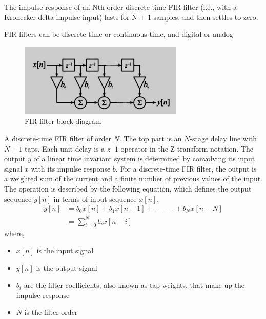 \documentclass[conference]{IEEEtran}
\begin{document}
The impulse response of an Nth-order discrete-time FIR filter (i.e., with a Kronecker delta impulse input) lasts for N + 1 samples, and then settles to zero.

FIR filters can be discrete-time or continuous-time, and digital or analog
\begin{figure}[!h]
	\begin{center} 
	    \includegraphics[width=0.8\columnwidth]{figs/FIR}
	\end{center}
\caption{FIR filter block diagram}
\label{fig:Fig1}
\end{figure}

A discrete-time FIR filter of order $N$. The top part is an $N$-stage delay line with $N+1$ taps. Each unit delay is a $z^-1$ operator in the Z-transform notation. The output $y$ of a linear time invariant system is determined by convolving its input signal $x$ with its impulse response $b$. For a discrete-time FIR filter, the output is a weighted sum of the current and a finite number of previous values of the input. The operation is described by the following equation, which defines the output sequence $y[n]$ in terms of input sequence $x[n]$.
\begin{align}
y[n] &= b_0x[n]+b_1x[n-1]+---+b_Nx[n-N]\\
 	 &= \sum_{i=0}^{N}b_ix[n-i] 
\end{align} 
where,
\begin{itemize}
\item $x[n]$ is the input signal
\item $y[n]$ is the output signal
\item $b_i$ are the filter coefficients, also known as tap weights, that make up the impulse response
\item $N$ is the filter order
\end{itemize}
\end{document}
